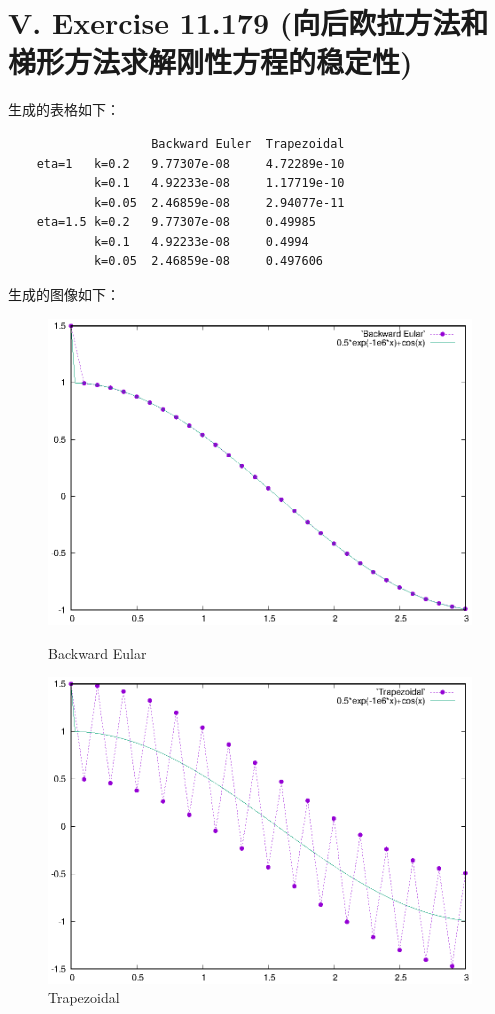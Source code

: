 \documentclass[twoside,a4paper]{article}
\begin{document}
\section*{V. Exercise 11.179 (向后欧拉方法和梯形方法求解刚性方程的稳定性)}

\;\;\;\;\;\;生成的表格如下：

\begin{lstlisting}
                    Backward Euler  Trapezoidal
    eta=1   k=0.2   9.77307e-08     4.72289e-10
            k=0.1   4.92233e-08     1.17719e-10
            k=0.05  2.46859e-08     2.94077e-11
    eta=1.5 k=0.2   9.77307e-08     0.49985
            k=0.1   4.92233e-08     0.4994
            k=0.05  2.46859e-08     0.497606
\end{lstlisting}

生成的图像如下：
\begin{figure}[H]
    \centering
    \begin{minipage}[t]{0.3\linewidth}
        \centering
        \includegraphics[width=0.95\linewidth]{figures/11-179-1.eps}
        \caption*{Backward Eular}
    \end{minipage}
    \hspace{2em}
    \begin{minipage}[t]{0.3\linewidth}
        \centering
        \includegraphics[width=0.95\linewidth]{figures/11-179-2.eps}
        \caption*{Trapezoidal}
    \end{minipage}
\end{figure}
\end{document}
